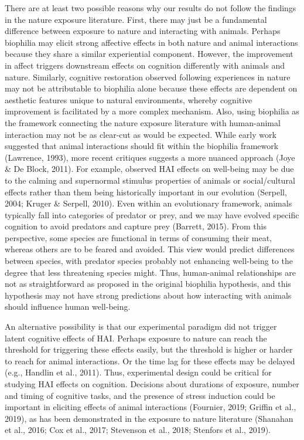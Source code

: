 \documentclass[
  english,
  pub,floatsintext]{apa6}
\begin{document}
There are at least two possible reasons why our results do not follow the findings in the nature exposure literature. First, there may just be a fundamental difference between exposure to nature and interacting with animals. Perhaps biophilia may elicit strong affective effects in both nature and animal interactions because they share a similar experiential component. However, the improvement in affect triggers downstream effects on cognition differently with animals and nature. Similarly, cognitive restoration observed following experiences in nature may not be attributable to biophilia alone because these effects are dependent on aesthetic features unique to natural environments, whereby cognitive improvement is facilitated by a more complex mechanism. Also, using biophilia as the framework connecting the nature exposure literature with human-animal interaction may not be as clear-cut as would be expected. While early work suggested that animal interactions should fit within the biophilia framework (Lawrence, 1993), more recent critiques suggests a more nuanced approach (Joye \& De Block, 2011). For example, observed HAI effects on well-being may be due to the calming and supernormal stimulus properties of animals or social/cultural effects rather than them being historically important in our evolution (Serpell, 2004; Kruger \& Serpell, 2010). Even within an evolutionary framework, animals typically fall into categories of predator or prey, and we may have evolved specific cognition to avoid predators and capture prey (Barrett, 2015). From this perspective, some species are functional in terms of consuming their meat, whereas others are to be feared and avoided. This view would predict differences between species, with predator species probably not enhancing well-being to the degree that less threatening species might. Thus, human-animal relationships are not as straightforward as proposed in the original biophilia hypothesis, and this hypothesis may not have strong predictions about how interacting with animals should influence human well-being.

An alternative possibility is that our experimental paradigm did not trigger latent cognitive effects of HAI. Perhaps exposure to nature can reach the threshold for triggering these effects easily, but the threshold is higher or harder to reach for animal interactions. Or the time lag for these effects may be delayed (e.g., Handlin et al., 2011). Thus, experimental design could be critical for studying HAI effects on cognition. Decisions about durations of exposure, number and timing of cognitive tasks, and the presence of stress induction could be important in eliciting effects of animal interactions (Fournier, 2019; Griffin et al., 2019), as has been demonstrated in the exposure to nature literature (Shanahan et al., 2016; Cox et al., 2017; Stevenson et al., 2018; Stenfors et al., 2019).
\end{document}
